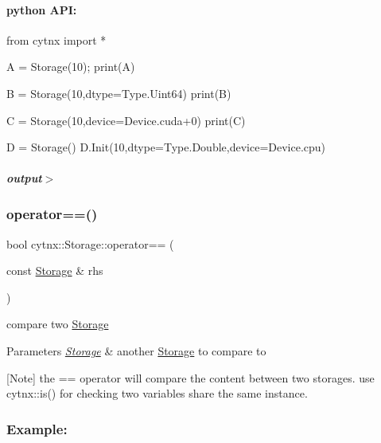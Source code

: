  \paragraph*{python A\+PI\+:}


\begin{DoxyCodeInclude}
\textcolor{keyword}{from} cytnx \textcolor{keyword}{import} *

A = Storage(10);
print(A)

B = Storage(10,dtype=Type.Uint64)
print(B)

C = Storage(10,device=Device.cuda+0)
print(C)

D = Storage()
D.Init(10,dtype=Type.Double,device=Device.cpu)


\end{DoxyCodeInclude}
 \subparagraph*{output$>$}


\begin{DoxyVerbInclude}
\end{DoxyVerbInclude}
 \mbox{\label{classcytnx_1_1Storage_ad304e00cf3d472ea0355af6b40c4529d}} 
\subsubsection{\texorpdfstring{operator==()}{operator==()}}
{\footnotesize\ttfamily bool cytnx\+::\+Storage\+::operator== (\begin{DoxyParamCaption}\item[{const \hyperlink{classcytnx_1_1Storage}{Storage} \&}]{rhs }\end{DoxyParamCaption})}



compare two \hyperlink{classcytnx_1_1Storage}{Storage} 


\begin{DoxyParams}{Parameters}
{\em \hyperlink{classcytnx_1_1Storage}{Storage}} & another \hyperlink{classcytnx_1_1Storage}{Storage} to compare to\\
\hline
\end{DoxyParams}
\mbox{[}Note\mbox{]} the == operator will compare the content between two storages. use cytnx\+::is() for checking two variables share the same instance.

\subsubsection*{Example\+:}

